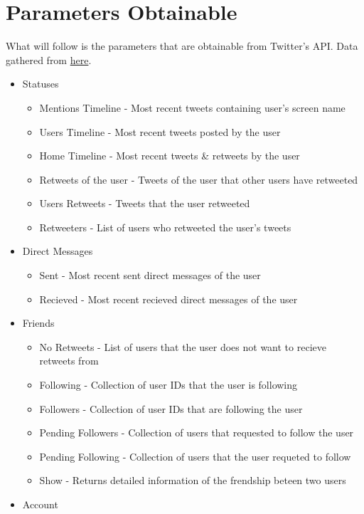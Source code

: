 \documentclass{article}
\begin{document}
\section{Parameters Obtainable}
	What will follow is the parameters that are obtainable from Twitter's API.
	Data gathered from \href{https://dev.twitter.com/rest/public}{here}.
	\begin{itemize}
		\item Statuses
			\begin{itemize}
				\item Mentions Timeline - Most recent tweets containing user's screen name
				\item Users Timeline - Most recent tweets posted by the user
				\item Home Timeline - Most recent tweets \& retweets by the user
				\item Retweets of the user - Tweets of the user that other users have retweeted
				\item Users Retweets - Tweets that the user retweeted
				\item Retweeters - List of users who retweeted the user's tweets
			\end{itemize}
		\item Direct Messages
			\begin{itemize}
				\item Sent - Most recent sent direct messages of the user
				\item Recieved - Most recent recieved direct messages of the user
			\end{itemize}
		\item Friends
			\begin{itemize}
				\item No Retweets - List of users that the user does not want to recieve retweets from
				\item Following - Collection of user IDs that the user is following
				\item Followers - Collection of user IDs that are following the user
				\item Pending Followers - Collection of users that requested to follow the user
				\item Pending Following - Collection of users that the user requeted to follow
				\item Show - Returns detailed information of the frendship beteen two users
			\end{itemize}
		\item Account
			\begin{itemize}

\end{itemize}
\end{itemize}
\end{document}
